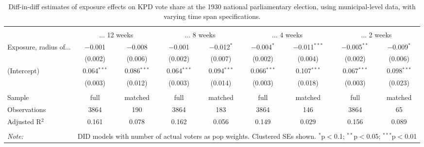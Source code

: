 
\begin{table}[!htbp] \centering 
  \caption{Diff-in-diff estimates of exposure effects on KPD vote share at the 1930 national parliamentary election, using municipal-level data, with varying time span specifications.\vspace{-.25cm}} 
  \label{tab:voteshare-kpd-timespan-dd-1930comm} 
\scriptsize 
\begin{tabular}{@{\extracolsep{5pt}}lcccccccc} 
\\[-1.8ex]\hline 
\hline \\[-1.8ex] 
 & \multicolumn{2}{c}{... 12 weeks} & \multicolumn{2}{c}{... 8 weeks} & \multicolumn{2}{c}{... 4 weeks} & \multicolumn{2}{c}{... 2 weeks} \\ 
 \cmidrule(r){2-3}\cmidrule(r){4-5}\cmidrule(r){6-7}\cmidrule(r){8-9}Exposure, radius of... & $-$0.001 & $-$0.008 & $-$0.001 & $-$0.012$^{*}$ & $-$0.004$^{*}$ & $-$0.011$^{***}$ & $-$0.005$^{**}$ & $-$0.009$^{*}$ \\ 
  & (0.002) & (0.006) & (0.002) & (0.007) & (0.002) & (0.004) & (0.002) & (0.006) \\ 
  (Intercept) & 0.064$^{***}$ & 0.086$^{***}$ & 0.064$^{***}$ & 0.094$^{***}$ & 0.066$^{***}$ & 0.107$^{***}$ & 0.067$^{***}$ & 0.098$^{***}$ \\ 
  & (0.003) & (0.012) & (0.003) & (0.014) & (0.003) & (0.018) & (0.003) & (0.023) \\ 
 \hline \\[-1.8ex] 
Sample & full & matched & full & matched & full & matched & full & matched \\ 
Observations & 3864 & 190 & 3864 & 183 & 3864 & 146 & 3864 & 65 \\ 
Adjusted R$^{2}$ & 0.161 & 0.078 & 0.162 & 0.056 & 0.149 & 0.029 & 0.156 & 0.089 \\ 
\hline 
\hline \\[-1.8ex] 
\textit{Note:}  & \multicolumn{8}{r}{DID models with number of actual voters as pop weights. Clustered SEs shown. $^{*}$p$<$0.1; $^{**}$p$<$0.05; $^{***}$p$<$0.01} \\ 
\end{tabular} 
\end{table} 
